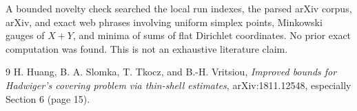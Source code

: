 \documentclass[11pt]{article}
\begin{document}
A bounded novelty check searched the local run indexes, the parsed arXiv
corpus, arXiv, and exact web phrases involving uniform simplex points,
Minkowski gauges of $X+Y$, and minima of sums of flat Dirichlet coordinates.
No prior exact computation was found.  This is not an exhaustive literature
claim.

\begin{thebibliography}{9}
H. Huang, B. A. Slomka, T. Tkocz, and B.-H. Vritsiou,
\emph{Improved bounds for Hadwiger's covering problem via thin-shell
estimates}, arXiv:1811.12548, especially Section 6 (page 15).
\end{thebibliography}
\end{document}

